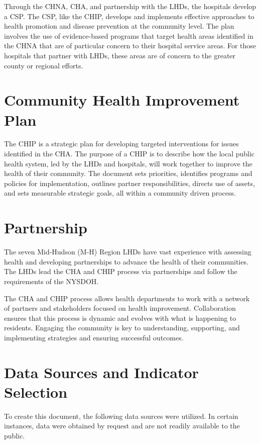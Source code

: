 \documentclass[
  english,
  letterpaper,
]{report}
\begin{document}
Through the CHNA, CHA, and partnership with the LHDs, the hospitals
develop a CSP. The CSP, like the CHIP, develops and implements effective
approaches to health promotion and disease prevention at the community
level. The plan involves the use of evidence-based programs that target
health areas identified in the CHNA that are of particular concern to
their hospital service areas. For those hospitals that partner with
LHDs, these areas are of concern to the greater county or regional
efforts.

\section{Community Health Improvement
Plan}\label{community-health-improvement-plan}

The CHIP is a strategic plan for developing targeted interventions for
issues identified in the CHA. The purpose of a CHIP is to describe how
the local public health system, led by the LHDs and hospitals, will work
together to improve the health of their community. The document sets
priorities, identifies programs and policies for implementation,
outlines partner responsibilities, directs use of assets, and sets
measurable strategic goals, all within a community driven process.

\section{Partnership}\label{partnership}

The seven Mid-Hudson (M-H) Region LHDs have vast experience with
assessing health and developing partnerships to advance the health of
their communities. The LHDs lead the CHA and CHIP process via
partnerships and follow the requirements of the NYSDOH.

The CHA and CHIP process allows health departments to work with a
network of partners and stakeholders focused on health improvement.
Collaboration ensures that this process is dynamic and evolves with what
is happening to residents. Engaging the community is key to
understanding, supporting, and implementing strategies and ensuring
successful outcomes.

\section{Data Sources and Indicator
Selection}\label{data-sources-and-indicator-selection}

To create this document, the following data sources were utilized. In
certain instances, data were obtained by request and are not readily
available to the public.
\end{document}
